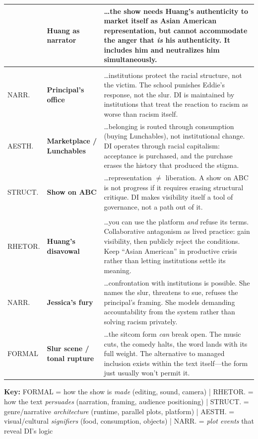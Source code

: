 \documentclass[12pt]{article}
\begin{document}
\begin{tabularx}{\textwidth}{|>{\centering\arraybackslash}p{1.3cm}|>{\raggedright\arraybackslash\bfseries}p{1.8cm}|X|}
\hline
{\scriptsize RHETOR.} & Huang as narrator &
\ldots the show needs Huang's authenticity to market itself as Asian American representation, but cannot accommodate the anger that \textit{is} his authenticity. It includes him and neutralizes him simultaneously. \\
\hline
\multicolumn{3}{|l|}{\textbf{IMPLIES (about DI) that\ldots}} \\
\hline
{\scriptsize NARR.} & Principal's office &
\ldots institutions protect the racial structure, not the victim. The school punishes Eddie's response, not the slur. DI is maintained by institutions that treat the reaction to racism as worse than racism itself. \\
\hline
{\scriptsize AESTH.} & Marketplace / Lunchables &
\ldots belonging is routed through consumption (buying Lunchables), not institutional change. DI operates through racial capitalism: acceptance is purchased, and the purchase erases the history that produced the stigma. \\
\hline
{\scriptsize STRUCT.} & Show on ABC &
\ldots representation $\neq$ liberation. A show on ABC is not progress if it requires erasing structural critique. DI makes visibility itself a tool of governance, not a path out of it. \\
\hline
\multicolumn{3}{|l|}{\textbf{IMAGINES (beyond DI) that\ldots}} \\
\hline
{\scriptsize RHETOR.} & Huang's disavowal &
\ldots you can use the platform \textit{and} refuse its terms. Collaborative antagonism as lived practice: gain visibility, then publicly reject the conditions. Keep ``Asian American'' in productive crisis rather than letting institutions settle its meaning. \\
\hline
{\scriptsize NARR.} & Jessica's fury &
\ldots confrontation with institutions is possible. She names the slur, threatens to sue, refuses the principal's framing. She models demanding accountability from the system rather than solving racism privately. \\
\hline
{\scriptsize FORMAL} & Slur scene / tonal rupture &
\ldots the sitcom form \textit{can} break open. The music cuts, the comedy halts, the word lands with its full weight. The alternative to managed inclusion exists within the text itself---the form just usually won't permit it. \\
\hline
\end{tabularx}

\vspace{6pt}
{\footnotesize \textbf{Key:} FORMAL = how the show is \textit{made} (editing, sound, camera) | RHETOR. = how the text \textit{persuades} (narration, framing, audience positioning) | STRUCT. = genre/narrative \textit{architecture} (runtime, parallel plots, platform) | AESTH. = visual/cultural \textit{signifiers} (food, consumption, objects) | NARR. = \textit{plot events} that reveal DI's logic}
\end{document}
